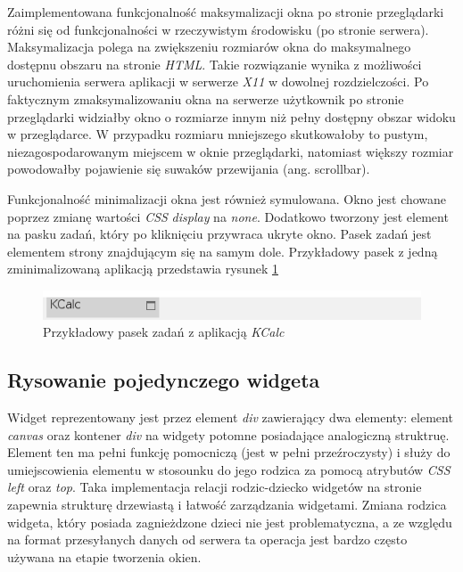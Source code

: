 Zaimplementowana funkcjonalność maksymalizacji okna po stronie przeglądarki różni się od funkcjonalności w rzeczywistym środowisku (po stronie serwera). Maksymalizacja polega na zwiększeniu rozmiarów okna do maksymalnego dostępnu obszaru na stronie \emph{HTML}.
Takie rozwiązanie wynika z możliwości uruchomienia serwera aplikacji w serwerze \emph{X11} w dowolnej rozdzielczości. Po faktycznym zmaksymalizowaniu okna na serwerze użytkownik po stronie przeglądarki widziałby okno o rozmiarze innym niż pełny dostępny obszar widoku w przeglądarce. W przypadku rozmiaru mniejszego skutkowałoby to pustym, niezagospodarowanym miejscem w oknie przeglądarki, natomiast większy rozmiar powodowałby pojawienie się suwaków przewijania (ang. scrollbar).

Funkcjonalność minimalizacji okna jest również symulowana. Okno jest chowane poprzez zmianę wartości \emph{CSS} \emph{display} na \emph{none}. Dodatkowo tworzony jest element na pasku zadań, który po kliknięciu przywraca ukryte okno. Pasek zadań jest elementem strony znajdującym się na samym dole. Przykładowy pasek z jedną zminimalizowaną aplikacją przedstawia rysunek \ref{fig:taskbar}

\begin{figure}
\centering
\includegraphics[width=0.7\linewidth]{img/taskbar}
\caption{Przykładowy pasek zadań z aplikacją \emph{KCalc}}
\label{fig:taskbar}
\end{figure}


\subsection{Rysowanie pojedynczego widgeta}

Widget reprezentowany jest przez element \emph{div} zawierający dwa elementy: element \emph{canvas} oraz kontener \emph{div} na widgety potomne posiadające analogiczną struktruę. Element ten ma pełni funkcję pomocniczą (jest w pełni przeźroczysty) i służy do umiejscowienia elementu w stosounku do jego rodzica za pomocą atrybutów \emph{CSS} \emph{left} oraz \emph{top}. Taka implementacja relacji rodzic-dziecko widgetów na stronie zapewnia strukturę drzewiastą i łatwość zarządzania widgetami. Zmiana rodzica widgeta, który posiada zagnieżdzone dzieci nie jest problematyczna, a ze względu na format przesyłanych danych od serwera ta operacja jest bardzo często używana na etapie tworzenia okien.

